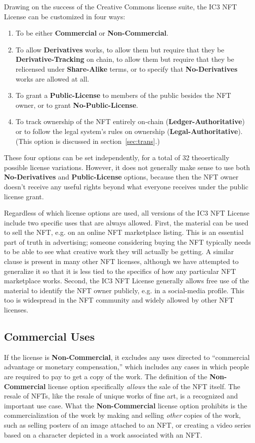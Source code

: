 \documentclass{article}
\newcommand{\iccclicense}{IC3 NFT License\xspace}
\newcommand{\keyword}[1]{\textbf{#1}\xspace}
\newcommand{\publiclicense}{\keyword{Public-License}}
\newcommand{\nopubliclicense}{\keyword{No-Public-License}}
\newcommand{\commercial}{\keyword{Commercial}}
\newcommand{\noncommercial}{\keyword{Non-Commercial}}
\newcommand{\derivative}{\keyword{Derivatives}}
\newcommand{\sharealike}{\keyword{Share-Alike}}
\newcommand{\derivativetracking}{\keyword{Derivative-Tracking}}
\newcommand{\noderivative}{\keyword{No-Derivatives}}
\newcommand{\ledger}{\keyword{Ledger-Authoritative}}
\newcommand{\legal}{\keyword{Legal-Authoritative}}
\begin{document}
Drawing on the success of the Creative Commons license suite, the \iccclicense can be customized in four ways: 
\begin{enumerate}
\item To be either \commercial or \noncommercial.
\item To allow \derivative works, to allow them but require that they be \derivativetracking on chain, to allow them but require that they be relicensed under \sharealike terms, or to specify that \noderivative works are allowed at all. 
\item To grant a \publiclicense to members of the public besides the NFT owner, or to grant \nopubliclicense.
\item To track ownership of the NFT entirely on-chain (\ledger) or to follow the legal system's rules on ownership (\legal). (This option is discussed in section~\ref{sec:trans}.)
\end{enumerate} 
These four options can be set independently, for a total of 32 theoertically possible license variations. However, it does not generally make sense to use both \noderivative and \publiclicense options, because then the NFT owner doesn't receive any useful rights beyond what everyone receives under the public license grant.

Regardless of which license options are used, all versions of the \iccclicense include two specific uses that are always allowed. First, the material can be used to sell the NFT, e.g. on an online NFT marketplace listing. This is an essential part of truth in advertising; someone considering buying the NFT typically needs to be able to see what creative work they will actually be getting. A similar clause is present in many other NFT licenses, although we have attempted to generalize it so that it is less tied to the specifics of how any particular NFT marketplace works. Second, the \iccclicense generally allows free use of the material to identify the NFT owner publicly, e.g. in a social-media profile. This too is widespread in the NFT community and widely allowed by other NFT licenses.


\subsection{Commercial Uses}

If the license is \noncommercial, it excludes any uses directed to ``commercial advantage or monetary compensation,'' which includes any cases in which people are required to pay to get a copy of the work.  The definition of the \noncommercial license option specifically \emph{allows} the sale of the NFT itself. The resale of NFTs, like the resale of unique works of fine art, is a recognized and important use case. What the \noncommercial license option prohibits is the commercialization of the work by making and selling \emph{other} copies of the work, such as selling posters of an image attached to an NFT, or creating a video series based on a character depicted in a work associated with an NFT.
\end{document}
